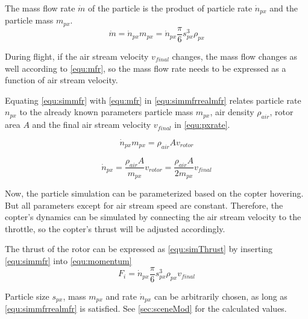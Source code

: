     The mass flow rate $\dot m$ of the particle is the product of particle rate $\dot n_{px}$ and the particle mass $m_{px}$.
    \begin{equation}
    \dot m =  \dot n_{px} m_{px}= \dot n_{px}  \frac{\pi}{6}s_{px}^3  \rho_{px}
    \label{equ:simmfr}
    \end{equation}
    
    During flight, if the air stream velocity $v_{final}$ changes, the mass flow changes as well according to \ref{equ:mfr}, so the mass flow rate needs to be expressed as a function of air stream velocity. 
    
    Equating \ref{equ:simmfr} with  \ref{equ:mfr} in \ref{equ:simmfrrealmfr} relates particle rate $n_{px}$ to the already known parameters particle mass $m_{px}$, air density $\rho_{air}$, rotor area $A$ and the final air stream velocity $v_{final}$ in \ref{equ:pxrate}.
    
    \begin{equation}
    \dot n_{px} m_{px} =  \rho_{air} A v_{rotor}
    \label{equ:simmfrrealmfr}
    \end{equation}
    
    \begin{equation}
    \dot n_{px} = \frac{\rho_{air} A}{m_{px}} v_{rotor} = \frac{\rho_{air} A}{2m_{px}} v_{final}
    \label{equ:pxrate}
    \end{equation}
    
    Now, the particle simulation can be parameterized based on the copter hovering. 
    But all parameters except for air stream speed are constant.
    Therefore,  the copter's dynamics can be simulated by connecting the air stream velocity to the throttle, so the copter's thrust will be adjusted accordingly.
    
    The thrust of the rotor can be expressed as \ref{equ:simThrust} by inserting \ref{equ:simmfr} into \ref{equ:momentum}
    \begin{equation}
    F_i = \dot n_{px}  \frac{\pi}{6}s_{px}^3  \rho_{px} v_{final}
    \label{equ:simThrust}
    \end{equation}
    
    Particle size $s_{px}$, mass $m_{px}$ and rate $\dot n_{px}$ can be arbitrarily chosen, as long as \ref{equ:simmfrrealmfr} is satisfied. See \ref{sec:sceneMod} for the calculated values.
    
    

    

    
